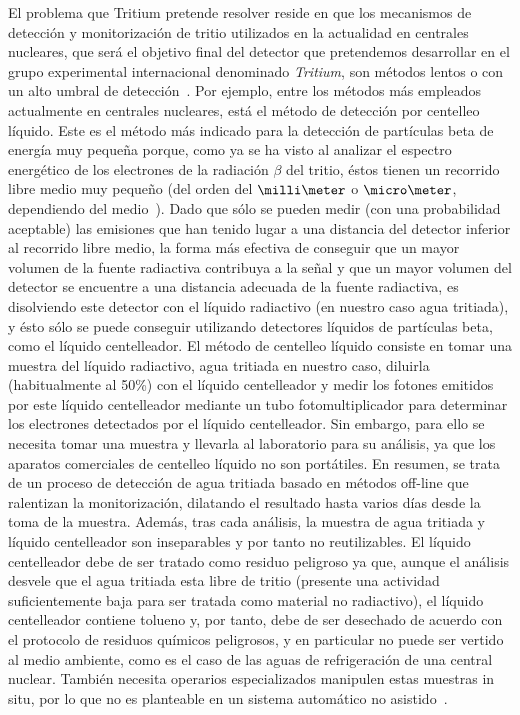 El problema que Tritium pretende resolver  reside en que los mecanismos de detección y monitorización de tritio utilizados en la actualidad en centrales nucleares, que será el objetivo final del detector que pretendemos desarrollar en el grupo experimental internacional denominado \textit{Tritium}, son métodos lentos o con un alto umbral de detección~\cite{Rat, limiteMB, Limitetiempo, Limite}. 
Por ejemplo, entre los métodos más empleados actualmente en centrales nucleares, está el método de detección  por centelleo líquido. Este es el método más indicado para la detección de partículas beta de energía muy pequeña porque, como ya se ha visto al analizar el espectro energético de los electrones de la radiación   $\beta$ del tritio, éstos tienen un recorrido libre medio muy pequeño (del orden del $\milli\meter$ o $\micro\meter$, dependiendo del medio~\cite{Isotopos}). Dado que sólo se pueden medir (con una probabilidad aceptable) las emisiones que han tenido lugar a una distancia del detector inferior al recorrido libre medio, la forma más efectiva de conseguir que un mayor volumen de la fuente radiactiva contribuya a la señal y que un mayor volumen del detector se encuentre a una distancia adecuada de la fuente radiactiva, es disolviendo este detector con el líquido radiactivo (en nuestro caso agua tritiada), y ésto sólo se puede conseguir utilizando detectores líquidos de partículas beta, como el líquido centelleador. 
El método de centelleo líquido consiste en tomar una muestra del líquido radiactivo, agua tritiada en nuestro caso, diluirla (habitualmente al 50\%) con el líquido centelleador y medir los fotones emitidos por este líquido centelleador mediante un tubo fotomultiplicador para determinar los electrones detectados por el líquido centelleador. Sin embargo, para ello se necesita tomar una muestra y llevarla al laboratorio para su análisis, ya que los aparatos comerciales de centelleo líquido no son portátiles. En resumen, se trata de un proceso de detección de agua tritiada basado en métodos off-line que ralentizan la monitorización, dilatando el resultado hasta varios días desde la toma de la muestra. 
Además, tras cada análisis, la muestra de agua tritiada y líquido centelleador son inseparables y por tanto no reutilizables.  El líquido centelleador debe de ser tratado como residuo peligroso ya que, aunque el análisis desvele que el agua tritiada esta libre de tritio (presente una actividad suficientemente baja para ser tratada como material no radiactivo), el líquido centelleador  contiene tolueno y, por tanto, debe de ser desechado de acuerdo con el protocolo de residuos químicos peligrosos, y en particular no puede ser vertido al medio ambiente, como es el caso de las aguas de refrigeración de una central nuclear. También necesita operarios especializados manipulen estas muestras in situ, por lo que no es planteable en un sistema automático no asistido~\cite{gel}.

